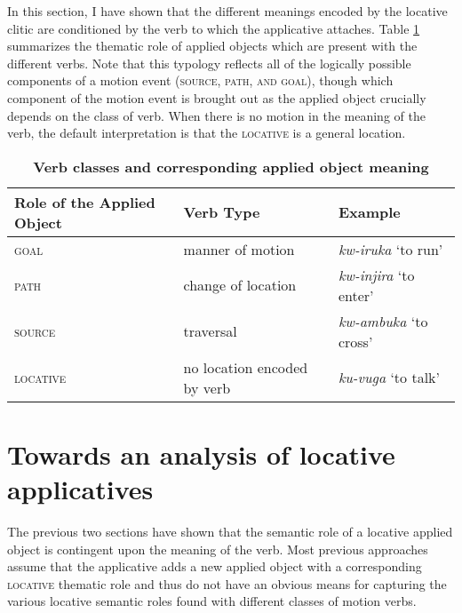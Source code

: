 \documentclass[output=paper]{langsci/langscibook}
\begin{document}
In this section, I have shown that the different meanings encoded by the locative clitic are conditioned by the verb to which the applicative attaches. Table \ref{tab:verb} summarizes the thematic role of applied objects which are present with the different verbs. Note that this typology reflects all of the logically possible components of a motion event ({\scshape source, path, and goal}), though which component of the motion event is brought out as the applied object crucially depends on the class of verb. When there is no motion in the meaning of the verb, the default interpretation is that the {\scshape locative} is a general location. 
\begin{table}
\begin{center}\caption{\textbf{Verb classes and corresponding applied object meaning}}
\begin{tabular}[t]{lll}\\\hline
Role of the Applied Object		& Verb Type		& Example \\\hline

{\scshape goal}					& manner of motion 	& \emph{kw-iruka} `to run' \\

{\scshape path} 					& change of location	& \emph{kw-injira} `to enter'\\

{\scshape source}			 	& traversal			& \emph{kw-ambuka} `to cross' \\

{\scshape  locative}		& no location encoded by verb & \emph{ku-vuga} `to talk' \\\hline

\end{tabular}
	
\label{tab:verb} 
			\end{center}
\end{table}








\section{Towards an analysis of locative applicatives}%

\label{sec:jerro:5}

The previous two sections have shown that the semantic role of a locative applied object is contingent upon the meaning of the verb. Most previous approaches assume that the applicative adds a new applied object with a corresponding {\scshape locative} thematic role and thus do not have an obvious means for capturing the various locative semantic roles found with different classes of motion verbs.
\end{document}
